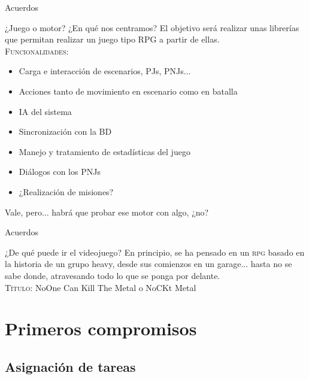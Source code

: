 \documentclass[9pt,xcolor=svgnames]{beamer}
\begin{document}
  \begin{frame}{Acuerdos}
   \transdissolve
   
   \begin{block}{¿Juego o motor? ¿En qué nos centramos?}
    El objetivo será realizar unas librerías que permitan realizar un
    juego tipo RPG a partir de ellas.\\
    
    \textsc{Funcionalidades}:
    \begin{itemize}
     \item Carga e interacción de escenarios, PJs, PNJs...
     \item Acciones tanto de movimiento en escenario como en batalla
     \item IA del sistema
     \item Sincronización con la BD
     \item Manejo y tratamiento de estadísticas del juego
     \item Diálogos con los PNJs
     \item ¿Realización de misiones?
    \end{itemize}
   \end{block}
   
   Vale, pero... habrá que probar ese motor con algo, ¿no?
  \end{frame}
  
  
  \begin{frame}{Acuerdos}
   \transdissolve
   
   \begin{block}{¿De qué puede ir el videojuego?}
    En principio, se ha pensado en un \textsc{rpg} basado en la historia
    de un grupo heavy, desde sus comienzos en un garage... hasta no se
    sabe donde, atravesando todo lo que se ponga por delante.\\[1cm]
    
    \Large{\textsc{Título:} NoOne Can Kill The Metal o NoCKt Metal}
   \end{block}
   
  \end{frame}
   
   
 \section{Primeros compromisos}
 
  \subsection{Asignación de tareas}
  
\end{document}

